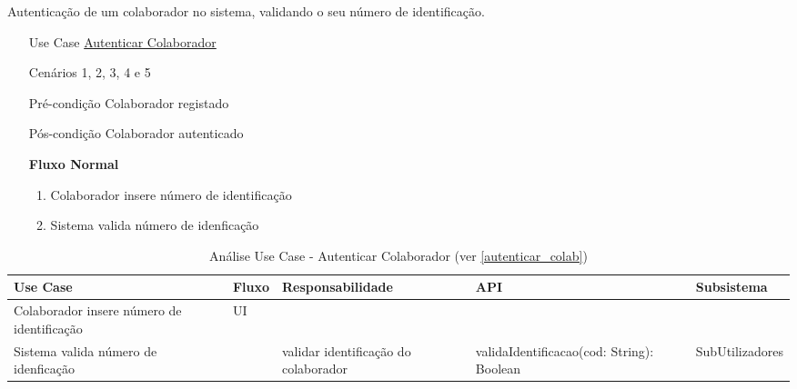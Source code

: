 \documentclass[../relatorio.tex]{subfiles}
\begin{document}
Autenticação de um colaborador no sistema, validando o seu número de identificação.
\begin{itemize}
    \item[Use Case] {\underline{Autenticar Colaborador}}
    \item[Cenários] {1, 2, 3, 4 e 5}
    \item[Pré-condição] {Colaborador registado}
    \item[Pós-condição] {Colaborador autenticado}
          \begin{flushleft}
              \textbf{Fluxo Normal}
          \end{flushleft}
          \begin{enumerate}
              \item Colaborador insere número de identificação
              \item Sistema valida número de idenficação
          \end{enumerate}
\end{itemize}
\begin{landscape}
    \begin{table}[!h]
        \centering
        \begin{tabular}{|p{5cm}|p{1cm}|p{4cm}|p{6cm}|p{3cm}|}
            \hline
            \rowcolor{gray!20!white}
            Use Case         & 
            Fluxo            & 
            Responsabilidade & 
            API              & 
            Subsistema
            \\
            \hline
            \rowcolor{yellow}
            Colaborador insere número de identificação
                             & UI
                             & 
                             & 
                             & 
            \\
            \hline
            Sistema valida número de idenficação
                             & 
                             & validar identificação do colaborador
                             & validaIdentificacao(cod: String): Boolean
                             & SubUtilizadores
            \\
            \hline
        \end{tabular}
        \caption{Análise Use Case - Autenticar Colaborador (ver \ref{autenticar_colab})}
    \end{table}
\end{landscape}
\end{document}
